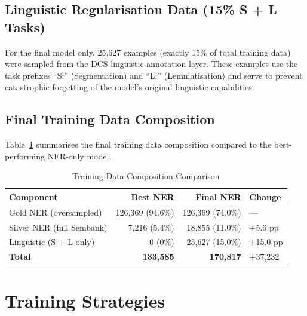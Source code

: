 \subsection{Linguistic Regularisation Data (15\% S + L Tasks)}
\label{subsec:linguistic_regularisation}

For the final model only, 25,627 examples (exactly 15\% of total training data) were sampled from the DCS \cite{hellwig2010dcs} linguistic annotation layer. These examples use the task prefixes ``S:'' (Segmentation) and ``L:'' (Lemmatisation) and serve to prevent catastrophic forgetting \cite{mccloskey1989catastrophic, goodfellow2013empirical} of the model's original linguistic capabilities.

\subsection{Final Training Data Composition}
\label{subsec:final_data_composition}

Table~\ref{tab:data_composition} summarises the final training data composition compared to the best-performing NER-only model.

\begin{table}[htbp]
    \centering
    \caption{Training Data Composition Comparison}
    \label{tab:data_composition}
    \begin{tabular}{lrrl}
        \toprule
        \textbf{Component} & \textbf{Best NER} & \textbf{Final NER} & \textbf{Change} \\
        \midrule
        Gold NER (oversampled) & 126,369 (94.6\%) & 126,369 (74.0\%) & — \\
        Silver NER (full Sembank) & 7,216 (5.4\%) & 18,855 (11.0\%) & +5.6 pp \\
        Linguistic (S + L only) & 0 (0\%) & 25,627 (15.0\%) & +15.0 pp \\
        \midrule
        \textbf{Total} & \textbf{133,585} & \textbf{170,817} & +37,232 \\
        \bottomrule
    \end{tabular}
\end{table}

\section{Training Strategies}
\label{sec:training_strategies}

